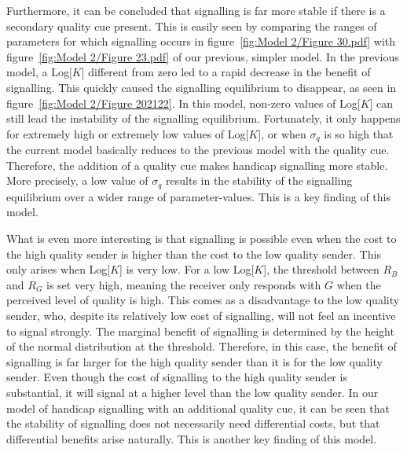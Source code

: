 \documentclass[a4paper,12pt]{article}
\numberwithin{equation}{section}
\begin{document}
Furthermore, it can be concluded that signalling is far more stable if there is a secondary quality cue present. This is easily seen by comparing the ranges of parameters for which signalling occurs in figure~\ref{fig:Model 2/Figure 30.pdf} with figure~\ref{fig:Model 2/Figure 23.pdf} of our previous, simpler model. In the previous model, a Log[$K$] different from zero led to a rapid decrease in the benefit of signalling. This quickly caused the signalling equilibrium to disappear, as seen in figure~\ref{fig:Model 2/Figure 202122}. In this model, non-zero values of Log[$K$] can still lead the instability of the signalling equilibrium. Fortunately, it only happens for extremely high or extremely low values of Log[$K$], or when $\sigma_{q}$ is so high that the current model basically reduces to the previous model with the quality cue. Therefore, the addition of a quality cue makes handicap signalling more stable. More precisely, a low value of $\sigma_{q}$ results in the stability of the signalling equilibrium over a wider range of parameter-values. This is a key finding of this model.

What is even more interesting is that signalling is possible even when the cost to the high quality sender is higher than the cost to the low quality sender. This only arises when Log[$K$] is very low. For a low Log[$K$], the threshold between $R_{B}$ and $R_{G}$ is set very high, meaning the receiver only responds with $G$ when the perceived level of quality is high. This comes as a disadvantage to the low quality sender, who, despite its relatively low cost of signalling, will not feel an incentive to signal strongly. The marginal benefit of signalling is determined by the height of the normal distribution at the threshold. Therefore, in this case, the benefit of signalling is far larger for the high quality sender than it is for the low quality sender. Even though the cost of signalling to the high quality sender is substantial, it will signal at a higher level than the low quality sender. In our model of handicap signalling with an additional quality cue, it can be seen that the stability of signalling does not necessarily need differential costs, but that differential benefits arise naturally. This is another key finding of this model.
\end{document}
